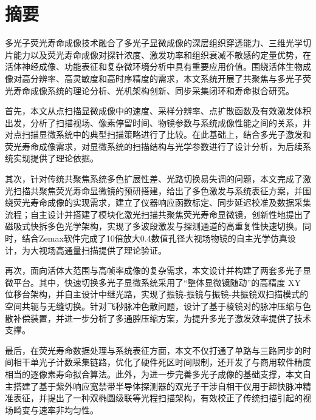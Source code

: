 
\maketitle%
\MAKETITLE%
\makedeclaration%
\intobmk\chapter*{摘\quad 要}%
\setcounter{page}{1}%

多光子荧光寿命成像技术融合了多光子显微成像的深层组织穿透能力、三维光学切片能力以及荧光寿命成像对探针浓度、激发功率和组织衰减不敏感的定量优势，在活体神经成像、功能表征和复杂微环境分析中具有重要应用价值。围绕活体生物成像对高分辨率、高灵敏度和高时序精度的需求，本文系统开展了共聚焦与多光子荧光寿命成像系统的理论分析、光机架构创新、同步采集闭环和寿命拟合研究。

首先，本文从点扫描显微成像中的速度、采样分辨率、点扩散函数及有效激发体积出发，分析了扫描视场、像素停留时间、物镜参数与系统成像性能之间的关系，并对点扫描显微系统中的典型扫描策略进行了比较。在此基础上，结合多光子激发和荧光寿命成像需求，对显微系统的扫描结构与光学参数进行了设计分析，为后续系统实现提供了理论依据。

其次，针对传统共聚焦系统多色扩展性差、光路切换易失调的问题，本文完成了激光扫描共聚焦荧光寿命显微镜的预研搭建，给出了多色激发与系统表征方案，并围绕荧光寿命成像的实现需求，建立了仪器响应函数标定、同步延迟校准及数据采集流程；自主设计并搭建了模块化激光扫描共聚焦荧光寿命显微镜，创新性地提出了磁吸式快拆多色光学架构，实现了多波段激发与探测通道的高重复性快速切换。同时，结合Zemax软件完成了10倍放大0.4数值孔径大视场物镜的自主光学仿真设计，为大视场高通量扫描提供了理论验证。

再次，面向活体大范围与高帧率成像的复杂需求，本文设计并构建了两套多光子显微平台。其中，快速切换多光子显微系统采用了``整体显微镜随动''的高精度 XY 位移台架构，并自主设计中继光路，实现了振镜-振镜与振镜-共振镜双扫描模式的空间共轭与无缝切换。针对飞秒脉冲色散问题，设计了基于棱镜对的脉冲压缩与色散补偿装置，并进一步分析了多通腔压缩方案，为提升多光子激发效率提供了技术支撑。

最后，在荧光寿命数据处理与系统表征方面，本文不仅打通了单路与三路同步的时间相干单光子计数采集链路，优化了硬件死区时间限制，还开发了与商用软件精度相当的逐像素寿命拟合算法。此外，为进一步完善多光子成像的基础支撑，本文自主搭建了基于紫外响应宽禁带半导体探测器的双光子干涉自相干仪用于超快脉冲精准表征，并提出了一种双椭圆级联等光程扫描架构，有效校正了传统扫描引起的视场畸变与速率非均匀性。

